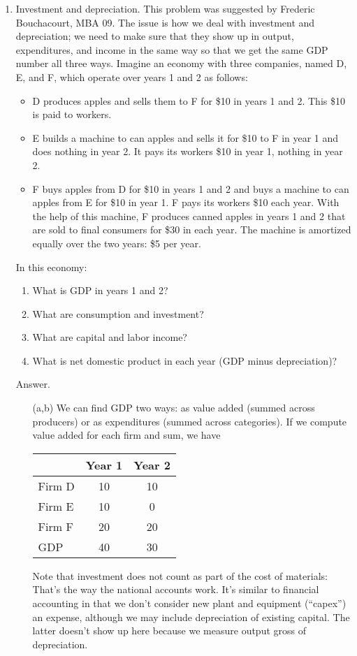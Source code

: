 \begin{enumerate}
\item Investment and depreciation.
This problem was suggested by Frederic Bouchacourt, MBA 09.
The issue is how we deal with investment and depreciation;
we need to make sure that they show up in output, expenditures, and income
in the same way so that we get the same GDP number all three ways.
Imagine an economy with three companies,
named D, E, and F,
which operate over years 1 and 2 as follows:
\begin{itemize}
\item D produces apples and sells them to F for \$10
    in years 1 and 2.
    This \$10 is paid to workers.
\item E builds a machine to can apples and sells it for \$10 to F in year 1 and does nothing in year 2.
    It pays its workers \$10 in year 1, nothing in year 2.
\item  F buys apples from D for \$10 in years 1 and 2 and buys a machine to can apples from E for \$10 in year 1.
    F pays its workers \$10 each year.
    With the help of this machine, F produces canned apples in years 1 and 2 that are sold to final consumers for \$30 in each year.
The machine is amortized equally over the two years:  \$5 per year.
\end{itemize}
In this economy:
\begin{enumerate}
\item What is GDP in years 1 and 2?
\item What are consumption and investment?
\item What are capital and labor income?
\item What is net domestic product in each year
(GDP minus depreciation)?
\end{enumerate}

Answer.
\begin{enumerate}
\item[(a,b)]
We can find GDP two ways:  as value added (summed across producers)
or as expenditures (summed across categories).
If we compute value added for each firm and sum, we have
%
    \begin{center}
    \begin{tabular}{lcc}
    \toprule
            &  Year 1  & Year 2 \\
            \midrule
    Firm D  &  10      &  10   \\
    Firm E  &  10      &  0 \\
    Firm F  &  20      &  20  \\
    \midrule
    GDP     &  40   &    30\\
    \bottomrule
    \end{tabular}
    \end{center}
%
Note that investment does not count as part of the cost
of materials:  That's the way the national accounts work.
It's similar to financial accounting in that we don't consider
new plant and equipment (``capex'') an expense,
although we may include depreciation of existing capital.
The latter doesn't show up here because we measure output
gross of depreciation.


\end{enumerate}
\end{enumerate}

